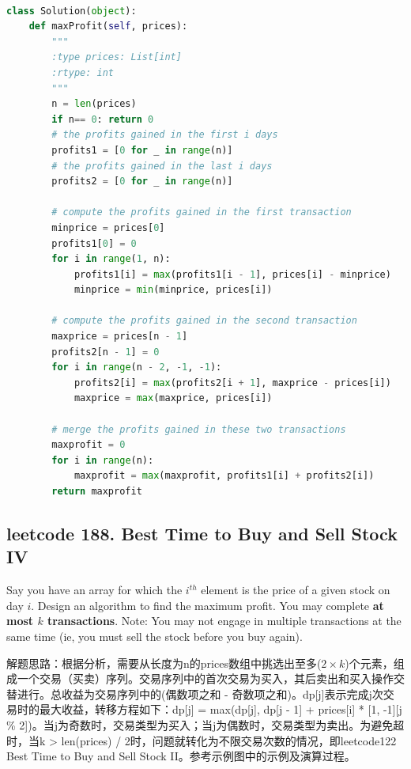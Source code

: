 \documentclass[a4paper,10pt]{article}
\begin{document}
\begin{lstlisting}[language=Python, caption=Problem123. Best Time to Buy and Sell Stock III]

class Solution(object):
    def maxProfit(self, prices):
        """
        :type prices: List[int]
        :rtype: int
        """
        n = len(prices)
        if n== 0: return 0
        # the profits gained in the first i days
        profits1 = [0 for _ in range(n)]
        # the profits gained in the last i days
        profits2 = [0 for _ in range(n)]

        # compute the profits gained in the first transaction
        minprice = prices[0]
        profits1[0] = 0
        for i in range(1, n):
            profits1[i] = max(profits1[i - 1], prices[i] - minprice)
            minprice = min(minprice, prices[i])

        # compute the profits gained in the second transaction
        maxprice = prices[n - 1]
        profits2[n - 1] = 0
        for i in range(n - 2, -1, -1):
            profits2[i] = max(profits2[i + 1], maxprice - prices[i])
            maxprice = max(maxprice, prices[i])

        # merge the profits gained in these two transactions
        maxprofit = 0
        for i in range(n):
            maxprofit = max(maxprofit, profits1[i] + profits2[i])
        return maxprofit
\end{lstlisting}



\subsection{leetcode 188. Best Time to Buy and Sell Stock IV}
Say you have an array for which the $i^{th}$ element is the price of a given stock on day $i$. Design an algorithm to find the maximum profit. You may complete \textbf{at most $k$ transactions}. Note: You may not engage in multiple transactions at the same time (ie, you must sell the stock before you buy again). \\

\begin{CJK*}{UTF8}{gbsn}
\noindent 解题思路：根据分析，需要从长度为n的prices数组中挑选出至多($2\times k$)个元素，组成一个交易（买卖）序列。交易序列中的首次交易为买入，其后卖出和买入操作交替进行。总收益为交易序列中的(偶数项之和 - 奇数项之和)。dp[j]表示完成j次交易时的最大收益，转移方程如下：dp[j] = max(dp[j], dp[j - 1] + prices[i] * [1, -1][j \% 2])。当j为奇数时，交易类型为买入；当j为偶数时，交易类型为卖出。为避免超时，当k > len(prices) / 2时，问题就转化为不限交易次数的情况，即leetcode122 Best Time to Buy and Sell Stock II。参考示例图中的示例及演算过程。\\
\end{CJK*}
\end{document}
